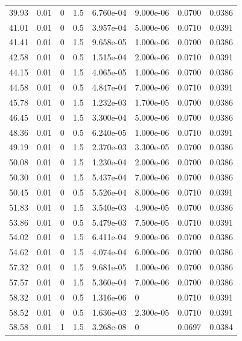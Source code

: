 \documentclass[preview]{standalone}
\begin{document}
{{{\begin{tabular}{L{1.2cm}C{1.2cm} C{0.3cm}C{0.5cm} C{1.4cm}C{1.4cm} C{1.4cm}C{1.4cm}}
  39.93  &  0.01  & 0     & 1.5 &  6.760e-04  & 9.000e-06  & 0.0700 &  0.0386   \\ 
  41.01  &  0.01  & 0     & 0.5 &  3.957e-04  & 5.000e-06  & 0.0710 &  0.0391   \\ 
  41.41  &  0.01  & 0     & 1.5 &  9.658e-05  & 1.000e-06  & 0.0700 &  0.0386   \\ 
  42.58  &  0.01  & 0     & 0.5 &  1.515e-04  & 2.000e-06  & 0.0710 &  0.0391   \\ 
  44.15  &  0.01  & 0     & 1.5 &  4.065e-05  & 1.000e-06  & 0.0700 &  0.0386   \\ 
  44.58  &  0.01  & 0     & 0.5 &  4.847e-04  & 7.000e-06  & 0.0710 &  0.0391   \\ 
  45.78  &  0.01  & 0     & 1.5 &  1.232e-03  & 1.700e-05  & 0.0700 &  0.0386   \\ 
  46.45  &  0.01  & 0     & 1.5 &  3.300e-04  & 5.000e-06  & 0.0700 &  0.0386   \\ 
  48.36  &  0.01  & 0     & 0.5 &  6.240e-05  & 1.000e-06  & 0.0710 &  0.0391   \\ 
  49.19  &  0.01  & 0     & 1.5 &  2.370e-03  & 3.300e-05  & 0.0700 &  0.0386   \\ 
  50.08  &  0.01  & 0     & 1.5 &  1.230e-04  & 2.000e-06  & 0.0700 &  0.0386   \\ 
  50.30  &  0.01  & 0     & 1.5 &  5.437e-04  & 7.000e-06  & 0.0700 &  0.0386   \\ 
  50.45  &  0.01  & 0     & 0.5 &  5.526e-04  & 8.000e-06  & 0.0710 &  0.0391   \\ 
  51.83  &  0.01  & 0     & 1.5 &  3.540e-03  & 4.900e-05  & 0.0700 &  0.0386   \\ 
  53.86  &  0.01  & 0     & 0.5 &  5.479e-03  & 7.500e-05  & 0.0710 &  0.0391   \\ 
  54.02  &  0.01  & 0     & 1.5 &  6.411e-04  & 9.000e-06  & 0.0700 &  0.0386   \\ 
  54.62  &  0.01  & 0     & 1.5 &  4.074e-04  & 6.000e-06  & 0.0700 &  0.0386   \\ 
  57.32  &  0.01  & 0     & 1.5 &  9.681e-05  & 1.000e-06  & 0.0700 &  0.0386   \\ 
  57.57  &  0.01  & 0     & 1.5 &  5.360e-04  & 7.000e-06  & 0.0700 &  0.0386   \\ 
  58.32  &  0.01  & 0     & 0.5 &  1.316e-06  & 0  & 0.0710 &  0.0391   \\ 
  58.52  &  0.01  & 0     & 0.5 &  1.636e-03  & 2.300e-05  & 0.0710 &  0.0391   \\ 
  58.58  &  0.01  & 1     & 1.5 &  3.268e-08  & 0  & 0.0697 &  0.0384   \\ 

\end{tabular}}}}
\end{document}
